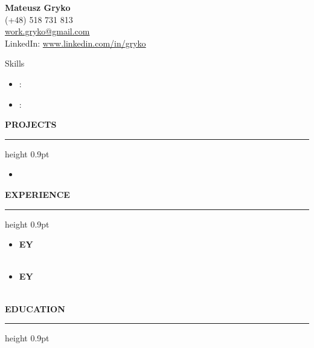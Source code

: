 \documentclass[11pt,letterpaper]{article}
\newcommand{\namesection}[2]{
    \begin{center}
        {\huge \bfseries #1}\\[-1pt]
        \small #2
    \end{center}\vspace{6pt}
}
\newenvironment{sectionheader}[1]{
    \vspace{6pt}\noindent\textbf{\uppercase{#1}}\vspace{1pt}\\[-2pt]
    \hrule height 0.9pt \vspace{3pt}
    \begin{itemize}[leftmargin=1.05em,itemsep=1pt,topsep=0pt]
}{
    \end{itemize}
}
\newenvironment{sectionheader_nobullet}[1]{
    \vspace{6pt}\noindent\textbf{\uppercase{#1}}\vspace{1pt}\\[-2pt]
    \hrule height 0.9pt \vspace{3pt}
    \begin{itemize}[leftmargin=0em,label={},itemsep=1pt,topsep=0pt]
}{
    \end{itemize}
}
\newenvironment{FitOnePage}
{%
  \newsavebox{\resumecontent}%
  \begin{lrbox}{\resumecontent}%
  \begin{minipage}{\textwidth}%
}
{%
  \end{minipage}%
  \end{lrbox}%
  \ifdim\ht\resumecontent>\textheight
    \begin{center}
      \adjustbox{max totalsize={\textwidth}{\textheight},center}{\usebox{\resumecontent}}
    \end{center}
  \else
    \usebox{\resumecontent}%
  \fi
}
\begin{document}
\begin{FitOnePage}\namesection{Mateusz Gryko}{%
(+48) 518 731 813 \\
\href{mailto:work.gryko@gmail.com}{work.gryko@gmail.com} \\
LinkedIn: \href{https://www.linkedin.com/in/gryko}{www.linkedin.com/in/gryko} \\
}
\begin{sectionheader_nobullet}{Skills}
\begin{itemize}[leftmargin=0em,label={},itemsep=0pt,topsep=0pt]
  \item \textbf{  }: 
  \item \textbf{  }: 
\end{itemize}
\end{sectionheader_nobullet}\begin{sectionheader}{Projects}
  \item \textbf{  }
  \begin{itemize}[leftmargin=1em,itemsep=1pt,topsep=1pt]
  \end{itemize}
\end{sectionheader}\begin{sectionheader}{Experience}
  \item \textbf{ EY } \hfill {\emph{  }}\\[-1pt]
        {\small }\\[-2pt]
        {\footnotesize }
  \item \textbf{ EY } \hfill {\emph{  }}\\[-1pt]
        {\small }\\[-2pt]
        {\footnotesize }
\end{sectionheader}\begin{sectionheader}{Education}
\end{sectionheader}\end{FitOnePage}
\end{document}
